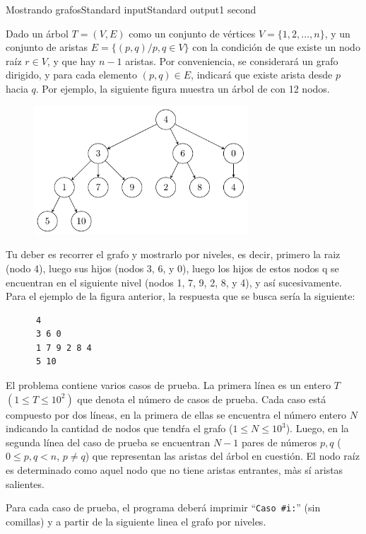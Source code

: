 \begin{problem}{Mostrando grafos}{Standard input}{Standard output}{1 second}{}


Dado un \'arbol $ T = (V, E)$ como un conjunto de v\'ertices $V = \lbrace 1, 2, \dots, n \rbrace$, y un conjunto de aristas $E = \lbrace (p, q) / p, q \in V \rbrace$ con la condici\'on de que existe un nodo ra\'iz $r \in V$, y que hay $n-1$ aristas. Por conveniencia, se considerar\'a un grafo dirigido, y para cada elemento $(p, q) \in E$, indicar\'a que existe arista desde $p$ hacia $q$. Por ejemplo, la siguiente figura muestra un \'arbol de con 12 nodos. 

\begin{figure}[h]
\centering
\includegraphics[width=8cm]{images/tree.pdf}
\end{figure}

Tu deber es recorrer el grafo y mostrarlo por niveles, es decir, primero la raiz (nodo 4), luego sus hijos (nodos 3, 6, y 0), luego los hijos de estos nodos q se encuentran en el siguiente nivel (nodos 1, 7, 9, 2, 8, y 4), y as\'i sucesivamente. Para el ejemplo de la figura anterior, la respuesta que se busca ser\'ia la siguiente:

\begin{verbatim}
      4
      3 6 0
      1 7 9 2 8 4
      5 10
\end{verbatim}

\InputFile
El problema contiene varios casos de prueba. La primera l\'inea es un entero $T$ $(1\leq T \leq 10^2)$ que denota el número de casos de prueba. Cada caso está compuesto por dos l\'ineas, en la primera de ellas se encuentra el n\'umero entero $N$ indicando la cantidad de nodos que tend\'ra el grafo ($1 \leq N \leq 10^3$). Luego, en la segunda l\'inea del caso de prueba se encuentran $N-1$ pares de n\'umeros $p, q$ ($0 \leq p, q < n$, $p \neq q$) que representan las aristas del \'arbol en cuesti\'on. El nodo ra\'iz es determinado como aquel nodo que no tiene aristas entrantes, m\`as s\'i aristas salientes.

\OutputFile
Para cada caso de prueba, el programa deber\'a imprimir ``\texttt{Caso \#i:}'' (sin comillas) y a partir de la siguiente linea el grafo por niveles. 

\Example

\begin{example}
\end{example}

\end{problem}
